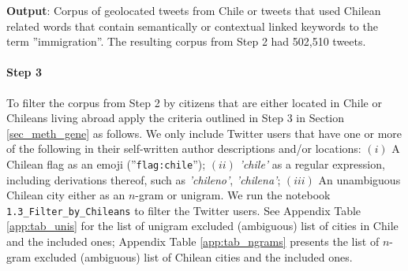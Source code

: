         
            \newline\indent
        \textbf{Output}: Corpus of geolocated tweets from Chile or tweets that used Chilean related words that contain semantically or contextual linked keywords to the term ''immigration''. The resulting corpus from Step 2 had 502,510 tweets.
        
        
        
        \paragraph{Step 3}
    
        To filter the corpus from Step 2 by citizens that are either located in Chile or Chileans living abroad apply the criteria outlined in Step 3 in Section \ref{sec_meth_gene} as follows. We only include Twitter users that have one or more of the following in their self-written author descriptions and/or locations: $(i)$ A Chilean flag as an emoji (''\texttt{flag:chile}''); $(ii)$ {\it 'chile'} as a regular expression, including derivations thereof, such as {\it 'chileno'}, {\it 'chilena'}; $(iii)$ An unambiguous Chilean city either as an $n$-gram or unigram. We run the notebook \texttt{1.3\_Filter\_by\_Chileans} to filter the Twitter users. See Appendix Table \ref{app:tab_unis} for the list of unigram excluded (ambiguous) list of cities in Chile and the included ones; Appendix Table \ref{app:tab_ngrams} presents the list of $n$-gram excluded (ambiguous) list of Chilean cities and the included ones.
        
        
    

